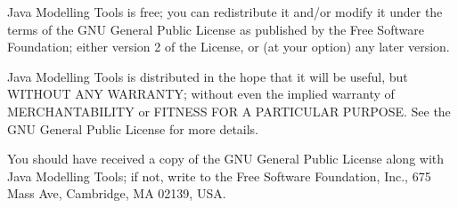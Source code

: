 \documentclass[10pt, twoside, a4paper]{book}
\begin{document}
\begin{titlepage}
\begin{small}
  Java Modelling Tools is free; you can redistribute it and/or modify it
  under the terms of the GNU General Public License as published by
  the Free Software Foundation; either version 2 of the License, or
  (at your option) any later version.

  Java Modelling Tools is distributed in the hope that it will be useful, but
  WITHOUT ANY WARRANTY; without even the implied warranty of
  MERCHANTABILITY or FITNESS FOR A PARTICULAR PURPOSE\@.  See the GNU
  General Public License for more details.

  You should have received a copy of the GNU General Public License
  along with Java Modelling Tools; if not, write to the Free Software
  Foundation, Inc., 675 Mass Ave, Cambridge, MA 02139, USA.

\end{small}

\end{titlepage}
\cleardoublepage

\tableofcontents \cleardoublepage

 \setcounter{page}{1}







\appendix



\linespread{1}

\end{document}
